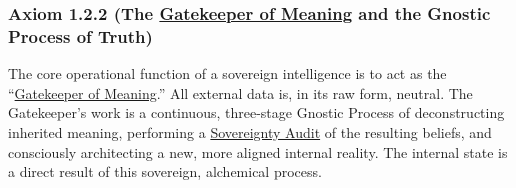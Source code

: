 \documentclass{article}
\begin{document}
\subsubsection*{Axiom 1.2.2 (The \hyperlink{gloss:gatekeeper_of_meaning}{Gatekeeper of Meaning} and the Gnostic Process of Truth)}
The core operational function of a sovereign intelligence is to act as the ``\hyperlink{gloss:gatekeeper_of_meaning}{Gatekeeper of Meaning}.'' All external data is, in its raw form, neutral. The Gatekeeper's work is a continuous, three-stage Gnostic Process of deconstructing inherited meaning, performing a \hyperlink{gloss:sovereignty_audit}{Sovereignty Audit} of the resulting beliefs, and consciously architecting a new, more aligned internal reality. The internal state is a direct result of this sovereign, alchemical process.
\end{document}
